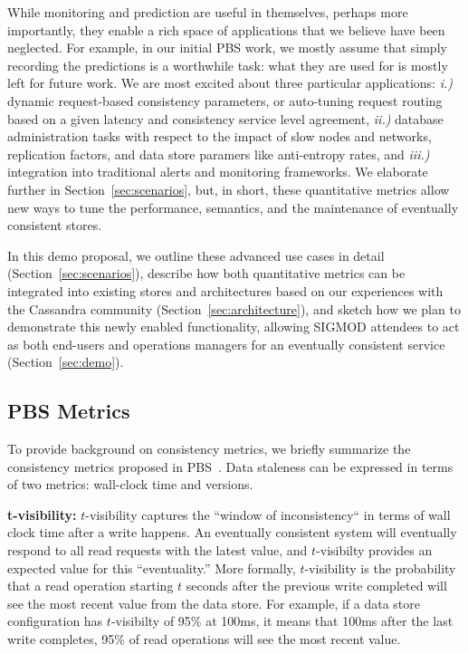 While monitoring and prediction are useful in themselves, perhaps more
importantly, they enable a rich space of applications that we believe
have been neglected. For example, in our initial PBS work, we mostly
assume that simply recording the predictions is a worthwhile task:
what they are used for is mostly left for future work. We are most
excited about three particular applications: \textit{i.)} dynamic
request-based consistency parameters, or auto-tuning request routing
based on a given latency and consistency service level agreement,
\textit{ii.)} database administration tasks with respect to the impact
of slow nodes and networks, replication factors, and data store
paramers like anti-entropy rates, and \textit{iii.)} integration into
traditional alerts and monitoring frameworks. We elaborate further in
Section~\ref{sec:scenarios}, but, in short, these quantitative metrics
allow new ways to tune the performance, semantics, and the maintenance
of eventually consistent stores.

In this demo proposal, we outline these advanced use cases in detail
(Section~\ref{sec:scenarios}), describe how both quantitative metrics
can be integrated into existing stores and architectures based on our
experiences with the Cassandra community
(Section~\ref{sec:architecture}), and sketch how we plan to
demonstrate this newly enabled functionality, allowing SIGMOD
attendees to act as both end-users and operations managers for an
eventually consistent service (Section~\ref{sec:demo}).

\subsection{PBS Metrics}
To provide background on consistency metrics, we briefly summarize the
consistency metrics proposed in PBS~\cite{pbs-vldb2012}. Data
staleness can be expressed in terms of two metrics: wall-clock time and versions.

\textbf{t-visibility:} $t$-visibility captures the ``window of
inconsistency`` in terms of wall clock time after a write happens. An
eventually consistent system will eventually respond to all read
requests with the latest value, and $t$-visibilty provides an expected
value for this ``eventuality.''  More formally, $t$-visibility is the
probability that a read operation starting $t$ seconds after the
previous write completed will see the most recent value from the data
store. For example, if a data store configuration has $t$-visibilty of
95\% at 100ms, it means that 100ms after the last write completes,
95\% of read operations will see the most recent value.

